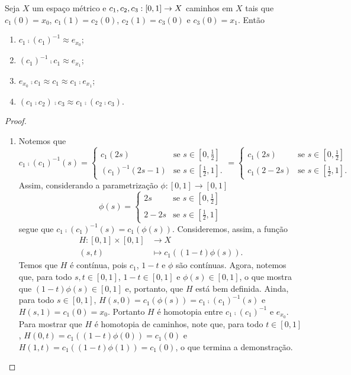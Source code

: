 \begin{proposition}
\label{prop:homo}
	Seja $X$ um espaço métrico e $c_1,c_2,c_3: \left[{0},{1}\right] \to X$ caminhos em $X$ tais que $c_1(0)=x_0$, $c_1(1)=c_2(0)$, $c_2(1)=c_3(0)$ e $c_3(0)=x_1$. Então
	\begin{enumerate}
	\item $c_1 \comp (c_1)^{-1} \approx e_{x_0}$;
	\item $(c_1)^{-1} \comp c_1 \approx e_{x_1}$;
	\item $e_{x_0} \comp c_1 \approx c_1 \approx c_1 \comp e_{x_1}$;
	\item $(c_1 \comp c_2) \comp c_3 \approx c_1 \comp (c_2 \comp c_3)$.
	\end{enumerate}
\end{proposition}
\begin{proof}
	\begin{enumerate}
	\item Notemos que
	\begin{equation*}
	c_1 \comp (c_1)^{-1}(s)
		=
			\begin{cases}
				c_1(2s) &\text{se $s \in [0,\frac{1}{2}]$} \\
				(c_1)^{-1}(2s-1) &\text{se $s \in [\frac{1}{2},1]$}.
			\end{cases}
		=
			\begin{cases}
				c_1(2s) &\text{se $s \in [0,\frac{1}{2}]$} \\
				c_1(2-2s) &\text{se $s \in [\frac{1}{2},1]$}.
			\end{cases}
	\end{equation*}
	Assim, considerando a parametrização $\phi: [0,1] \to [0,1]$
	\begin{equation*}
	\phi(s)
		=
			\begin{cases}
				2s &\text{se $s \in [0,\frac{1}{2}]$} \\
				2-2s &\text{se $s \in [\frac{1}{2},1]$}
			\end{cases}
	\end{equation*}
segue que $c_1 \comp (c_1)^{-1}(s) = c_1(\phi(s))$.
Consideremos, assim, a função
	\begin{align*}
	H: [0,1] \times [0,1] &\to X \\
		(s,t) &\mapsto c_1((1-t)\phi(s)).
	\end{align*}
	Temos que $H$ é contínua, pois $c_1$, $1-t$ e $\phi$ são contínuas. Agora, notemos que, para todo $s,t \in [0,1]$, $1-t \in [0,1]$ e $\phi(s) \in [0,1]$, o que mostra que $(1-t)\phi(s) \in [0,1]$ e, portanto, que $H$ está bem definida. Ainda, para todo $s \in [0,1]$, $H(s,0)=c_1(\phi(s))=c_1 \comp (c_1)^{-1}(s)$ e $H(s,1)=c_1(0)=x_0$. Portanto $H$ é homotopia entre $c_1 \comp (c_1)^{-1}$ e $e_{x_0}$.	Para mostrar que $H$ é homotopia de caminhos, note que, para todo $t \in [0,1]$,	$H(0,t)=c_1((1-t)\phi(0))=c_1(0)$ e $H(1,t)=c_1((1-t)\phi(1))=c_1(0)$, o que termina a demonstração.
	

\end{enumerate}
\end{proof}
